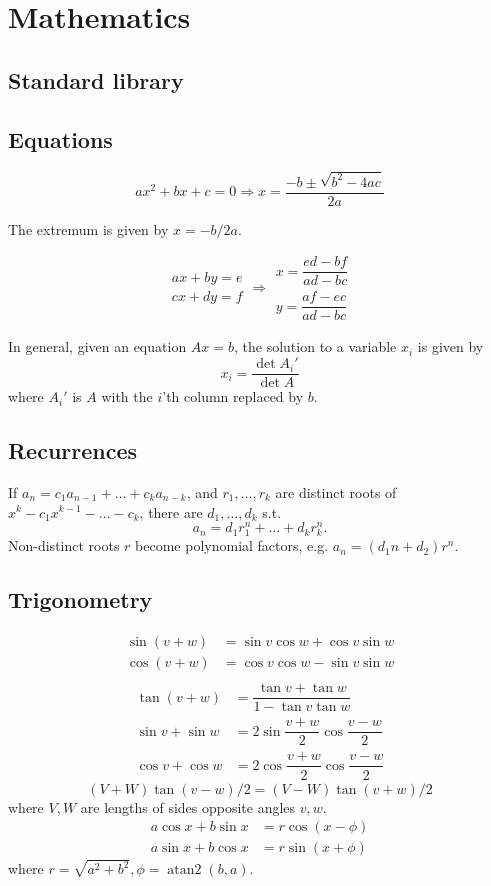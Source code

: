 
\chapter{Mathematics}

\section{Standard library}

\section{Equations}
\[ax^2+bx+c=0 \Rightarrow x = \frac{-b\pm\sqrt{b^2-4ac}}{2a}\]

The extremum is given by $x = -b/2a$.

\[\begin{aligned}ax+by=e\\cx+dy=f\end{aligned}
\Rightarrow
\begin{aligned}x=\dfrac{ed-bf}{ad-bc}\\y=\dfrac{af-ec}{ad-bc}\end{aligned}\]

In general, given an equation $Ax = b$, the solution to a variable $x_i$ is given by
\[x_i = \frac{\det A_i'}{\det A} \]
where $A_i'$ is $A$ with the $i$'th column replaced by $b$.

\section{Recurrences}
If $a_n = c_1 a_{n-1} + \dots + c_k a_{n-k}$, and $r_1, \dots, r_k$ are distinct roots of $x^k - c_1 x^{k-1} - \dots - c_k$, there are $d_1, \dots, d_k$ s.t.
\[a_n = d_1r_1^n + \dots + d_kr_k^n. \]
Non-distinct roots $r$ become polynomial factors, e.g. $a_n = (d_1n + d_2)r^n$.

\section{Trigonometry}
\begin{align*}
\sin(v+w)&{}=\sin v\cos w+\cos v\sin w\\
\cos(v+w)&{}=\cos v\cos w-\sin v\sin w\\
\end{align*}
\begin{align*}
\tan(v+w)&{}=\dfrac{\tan v+\tan w}{1-\tan v\tan w}\\
\sin v+\sin w&{}=2\sin\dfrac{v+w}{2}\cos\dfrac{v-w}{2}\\
\cos v+\cos w&{}=2\cos\dfrac{v+w}{2}\cos\dfrac{v-w}{2}
\end{align*}
\[ (V+W)\tan(v-w)/2{}=(V-W)\tan(v+w)/2 \]
where $V, W$ are lengths of sides opposite angles $v, w$.
\begin{align*}
	a\cos x+b\sin x&=r\cos(x-\phi)\\
	a\sin x+b\cos x&=r\sin(x+\phi)
\end{align*}
where $r=\sqrt{a^2+b^2}, \phi=\operatorname{atan2}(b,a)$.

